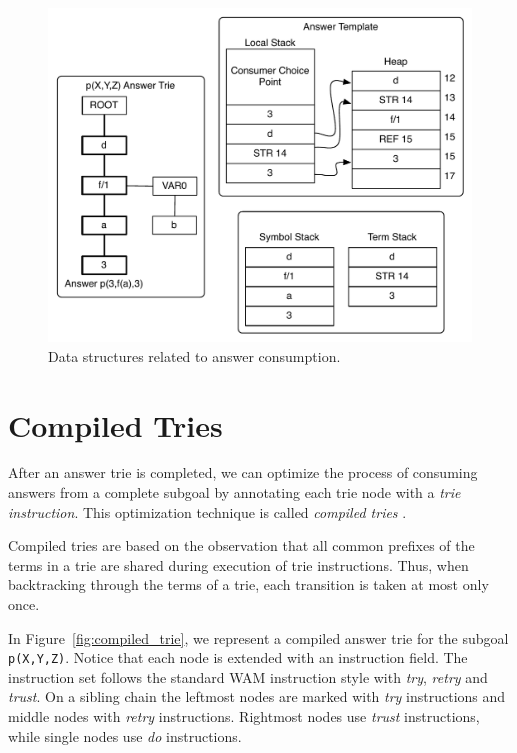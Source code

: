 \begin{figure}[H]
  \centering
    \includegraphics[scale=0.6]{consume_answer.pdf}
  \caption{Data structures related to answer consumption.}
  \label{fig:consume_answer}
\end{figure}

\section{Compiled Tries}\label{sec:compiled_tries}

After an answer trie is completed, we can optimize the process of consuming answers from a complete
subgoal by annotating each trie node with a \textit{trie instruction}. This optimization technique
is called \textit{compiled tries} \cite{RamakrishnanIV-99}.

Compiled tries are based on the observation that all common prefixes of the terms in a trie
are shared during execution of trie instructions. Thus, when backtracking
through the terms of a trie, each transition is taken at most only once.

In Figure~\ref{fig:compiled_trie}, we represent a compiled answer trie for the subgoal
\texttt{p(X,Y,Z)}. Notice that each node is extended with an instruction field.
The instruction set follows the standard WAM instruction style with \textit{try},
\textit{retry} and \textit{trust}. On a sibling chain the leftmost nodes are marked
with \textit{try} instructions and middle nodes with \textit{retry} instructions. Rightmost
nodes use \textit{trust} instructions, while single nodes use \textit{do} instructions.

